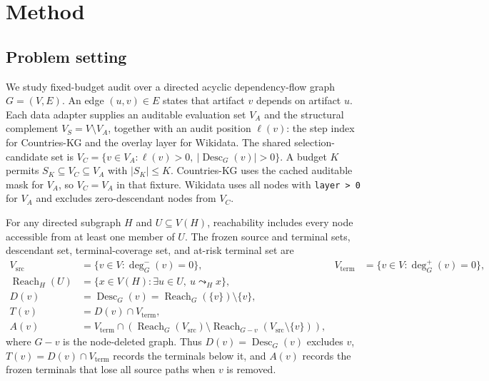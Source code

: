 \documentclass[pdflatex,sn-basic]{sn-jnl}
\begin{document}
\FloatBarrier

\section{Method}
\label{sec:methods}

\subsection{Problem setting}

We study fixed-budget audit over a directed acyclic dependency-flow graph $G=(V,E)$. An edge $(u,v)\in E$ states that artifact $v$ depends on artifact $u$. Each data adapter supplies an auditable evaluation set $V_A$ and the structural complement $V_S=V\setminus V_A$, together with an audit position $\ell(v)$: the step index for Countries-KG and the overlay layer for Wikidata. The shared selection-candidate set is $V_C=\{v\in V_A:\ell(v)>0,\ |\operatorname{Desc}_{G}(v)|>0\}$. A budget $K$ permits $S_K\subseteq V_C\subseteq V_A$ with $|S_K|\le K$. Countries-KG uses the cached auditable mask for $V_A$, so $V_C=V_A$ in that fixture. Wikidata uses all nodes with \texttt{layer > 0} for $V_A$ and excludes zero-descendant nodes from $V_C$.

For any directed subgraph $H$ and $U\subseteq V(H)$, reachability includes every node accessible from at least one member of $U$. The frozen source and terminal sets, descendant set, terminal-coverage set, and at-risk terminal set are
\begin{equation}
\begin{aligned}
V_{\mathrm{src}}&=\{v\in V:\deg_G^-(v)=0\}, &
V_{\mathrm{term}}&=\{v\in V:\deg_G^+(v)=0\},\\
\operatorname{Reach}_{H}(U)&=\{x\in V(H):\exists u\in U,\ u\leadsto_H x\},\\
D(v)&=\operatorname{Desc}_{G}(v)=\operatorname{Reach}_{G}(\{v\})\setminus\{v\},\\
T(v)&=D(v)\cap V_{\mathrm{term}},\\
A(v)&=V_{\mathrm{term}}\cap\left(
\operatorname{Reach}_{G}(V_{\mathrm{src}})
\setminus\operatorname{Reach}_{G-v}(V_{\mathrm{src}}\setminus\{v\})
\right),
\end{aligned}
\label{eq:structural-sets}
\end{equation}
where $G-v$ is the node-deleted graph. Thus $D(v)=\operatorname{Desc}_{G}(v)$ excludes $v$, $T(v)=D(v)\cap V_{\mathrm{term}}$ records the terminals below it, and $A(v)$ records the frozen terminals that lose all source paths when $v$ is removed.
\end{document}
